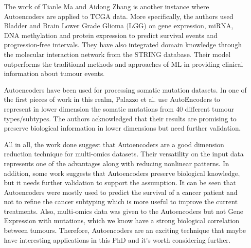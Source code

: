 The work of Tianle Ma and Aidong Zhang \cite{Ma2019-hk} is another instance where Autoencoders are applied to TCGA data. More specifically, the authors used Bladder and Brain Lower Grade Glioma (LGG) on gene expression, miRNA, DNA methylation and protein expression to predict survival events and progression-free intervals. They have also integrated domain knowledge through the molecular interaction network from the STRING database. Their model outperforms the traditional methods and approaches of ML in providing clinical information about tumour events.

Autoencoders have been used for processing somatic mutation datasets. In one of the first pieces of work in this realm, Palazzo et al. \cite{Palazzo2019-hx} use AutoEncoders to represent in lower dimension the somatic mutations from 40 different tumour types/subtypes. The authors acknowledged that their results are promising to preserve biological information in lower dimensions but need further validation.


All in all, the work done suggest that Autoencoders are a good dimension reduction technique for multi-omics datasets. Their versatility on the input data represents one of the advantages along with reducing nonlinear patterns. In addition, some work suggests that Autoencoders preserve biological knowledge, but it needs further validation to support the assumption. It can be seen that Autoencoders were mostly used to predict the survival of a cancer patient and not to refine the cancer subtyping which is more useful to improve the current treatments. Also, multi-omics data was given to the Autoencoders but not Gene Expression with mutations, which we know have a strong biological correlation between tumours. Therefore, Autoencoders are an exciting technique that maybe have interesting applications in this PhD and it's worth considering further.

